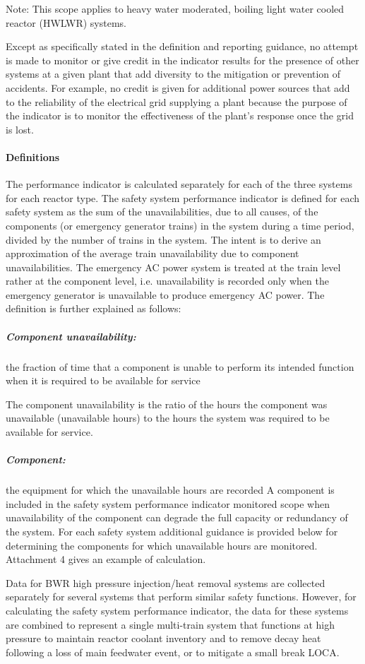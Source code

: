 Note: This scope applies to heavy water moderated, boiling light water
cooled reactor (HWLWR) systems.

Except as specifically stated in the definition and reporting
guidance, no attempt is made to monitor or give credit in the
indicator results for the presence of other systems at a given plant
that add diversity to the mitigation or prevention of accidents. For
example, no credit is given for additional power sources that add to
the reliability of the electrical grid supplying a plant because the
purpose of the indicator is to monitor the effectiveness of the
plant's response once the grid is lost.

\paragraph{Definitions}

The performance indicator is calculated separately for each of the
three systems for each reactor type. The safety system performance
indicator is defined for each safety system as the sum of the
unavailabilities, due to all causes, of the components (or emergency
generator trains) in the system during a time period, divided by the
number of trains in the system. The intent is to derive an
approximation of the average train unavailability due to component
unavailabilities. The emergency AC power system is treated at the
train level rather at the component level, i.e. unavailability is
recorded only when the emergency generator is unavailable to produce
emergency AC power. The definition is further explained as follows:

\subparagraph{Component unavailability:} the fraction of time that a
component is unable to perform its intended function when it is
required to be available for service

The component unavailability is the ratio of the hours the component
was unavailable (unavailable hours) to the hours the system was
required to be available for service.

\subparagraph{Component:} the equipment for which the unavailable
hours are recorded A component is included in the safety system
performance indicator monitored scope when unavailability of the
component can degrade the full capacity or redundancy of the
system. For each safety system additional guidance is provided below
for determining the components for which unavailable hours are
monitored. Attachment 4 gives an example of calculation.

Data for BWR high pressure injection/heat removal systems are
collected separately for several systems that perform similar safety
functions. However, for calculating the safety system performance
indicator, the data for these systems are combined to represent a
single multi-train system that functions at high pressure to maintain
reactor coolant inventory and to remove decay heat following a loss of
main feedwater event, or to mitigate a small break LOCA.

